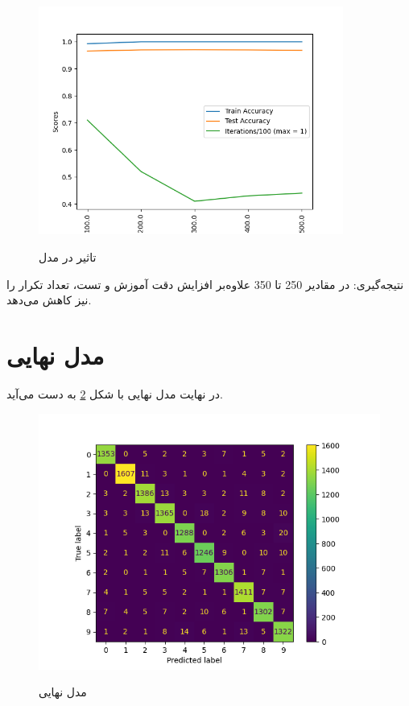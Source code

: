\documentclass[12pt, dvipsnames, svgnames, x11names,]{article}
\begin{document}
		
		\begin{figure}
			\begin{center}
				{\includegraphics[width=10cm]{images/17.png}}
			\end{center}
			\caption{تاثیر  در مدل}
			\label{fig:batch_size}
		\end{figure}
		
		نتیجه‌گیری:  در مقادیر 250 تا 350 علاوه‌بر افزایش دقت آموزش و تست، تعداد تکرار را نیز کاهش می‌دهد.
		
	\section{مدل نهایی}
	
		در نهایت مدل نهایی با  شکل \ref{fig:final} به دست می‌آید.
		
		\begin{figure}
			\begin{center}
				{\includegraphics[width=14cm]{images/18.png}}
			\end{center}
			\caption{ مدل نهایی}
			\label{fig:final}
		\end{figure}
		
\end{document}
